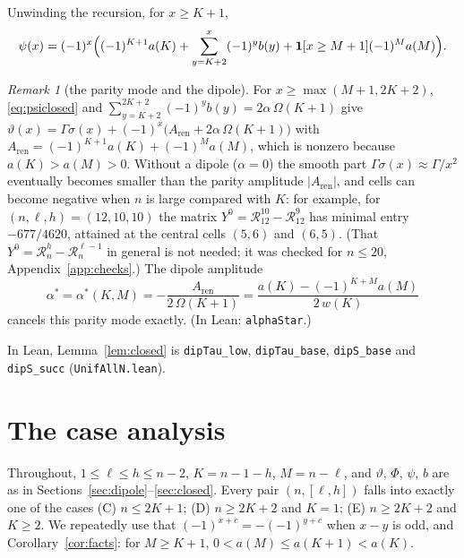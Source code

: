\documentclass[11pt]{amsart}
\theoremstyle{definition}
\theoremstyle{remark}
\newtheorem{remark}[lemma]{Remark}
\numberwithin{equation}{section}
\newcommand{\ind}[1]{\mathbf{1}[#1]}
\newcommand{\cR}{\mathcal{R}}
\newcommand{\lean}[1]{\texttt{#1}}
\begin{document}
Unwinding the recursion, for $x\ge K+1$,
\begin{equation}\label{eq:psiclosed}
  \psi(x)=(-1)^x\Bigl((-1)^{K+1}a(K)+\sum_{y=K+2}^{x}(-1)^yb(y)+\ind{x\ge M+1}(-1)^Ma(M)\Bigr).
\end{equation}

\begin{remark}[the parity mode and the dipole]\label{rem:parity}
For $x\ge\max(M+1,2K+2)$, \eqref{eq:psiclosed} and $\sum_{y=K+2}^{2K+2}(-1)^yb(y)=2\alpha\,\Omega(K+1)$ give
$\vartheta(x)=\Gamma\sigma(x)+(-1)^x\bigl(A_{\mathrm{ren}}+2\alpha\,\Omega(K+1)\bigr)$ with
$A_{\mathrm{ren}}=(-1)^{K+1}a(K)+(-1)^Ma(M)$, which is nonzero because $a(K)>a(M)>0$. Without a dipole
($\alpha=0$) the smooth part $\Gamma\sigma(x)\approx\Gamma/x^2$ eventually becomes smaller than the parity
amplitude $|A_{\mathrm{ren}}|$, and cells can become negative when $n$ is large compared with $K$: for
example, for $(n,\ell,h)=(12,10,10)$ the matrix $Y^0=\cR^{10}_{12}-\cR^{9}_{12}$ has minimal entry
$-677/4620$, attained at the central cells $(5,6)$ and $(6,5)$. (That $Y^0=\cR^h_n-\cR^{\ell-1}_n$ in
general is not needed; it was checked for $n\le20$, Appendix~\ref{app:checks}.) The dipole amplitude
\begin{equation}\label{eq:alphastar}
  \alpha^*=\alpha^*(K,M)=-\frac{A_{\mathrm{ren}}}{2\,\Omega(K+1)}=\frac{a(K)-(-1)^{K+M}a(M)}{2\,w(K)}
\end{equation}
cancels this parity mode exactly. (In Lean: \lean{alphaStar}.)
\end{remark}

In Lean, Lemma~\ref{lem:closed} is \lean{dipTau\_low}, \lean{dipTau\_base}, \lean{dipS\_base} and
\lean{dipS\_succ} (\lean{UnifAllN.lean}).

\section{The case analysis}\label{sec:cases}

Throughout, $1\le\ell\le h\le n-2$, $K=n-1-h$, $M=n-\ell$, and $\vartheta$, $\Phi$, $\psi$, $b$ are as in
Sections~\ref{sec:dipole}--\ref{sec:closed}. Every pair $(n,[\ell,h])$ falls into exactly one of the cases
(C) $n\le2K+1$; (D) $n\ge2K+2$ and $K=1$; (E) $n\ge2K+2$ and $K\ge2$. We repeatedly use that
$(-1)^{x+c}=-(-1)^{y+c}$ when $x-y$ is odd, and Corollary~\ref{cor:facts}: for $M\ge K+1$,
$0<a(M)\le a(K+1)<a(K)$.
\end{document}
